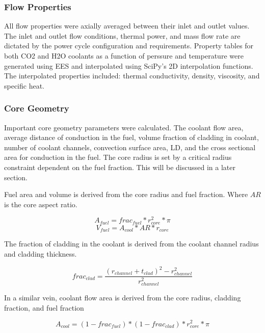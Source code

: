 \subsubsection{Flow Properties}
All flow properties were axially averaged between their inlet and outlet values.
The inlet and outlet flow conditions, thermal power, and mass flow rate are
dictated by the power cycle configuration and requirements. Property tables for
both CO2 and H2O coolants as a function of perssure and temperature were 
generated using EES and interpolated using SciPy's 2D interpolation functions.
The interpolated properties included: thermal conductivity, density, viscosity,
and specific heat.

\subsubsection{Core Geometry}

Important core geometry parameters were calculated. The coolant flow area,
average distance of conduction in the fuel, volume fraction of cladding in
coolant, number of coolant channels, convection surface area, LD, and the cross
sectional area for conduction in the fuel. The core radius is set by a critical
radius constraint dependent on the fuel fraction. This will be discussed in a
later section.

Fuel area and volume is derived from the core radius and fuel fraction. Where
$AR$ is the core aspect ratio.

\begin{equation}
    A_{fuel} = frac_{fuel}*r_{core}^2*\pi
\end{equation}
\begin{equation}
    V_{fuel} = A_{cool}*AR*r_{core}
\end{equation}

The fraction of cladding in the coolant is derived from the coolant channel
radius and cladding thickness.

\begin{equation}
    frac_{clad} = \frac{(r_{channel} + t_{clad})^2 - r_{channel}^2}{r_{channel}^2} 
\end{equation}

In a similar vein, coolant flow area is derived from the core radius, cladding
fraction, and fuel fraction

\begin{equation}
    A_{cool} = (1-frac_{fuel})*(1-frac_{clad})*r_{core}^2*\pi
\end{equation}

